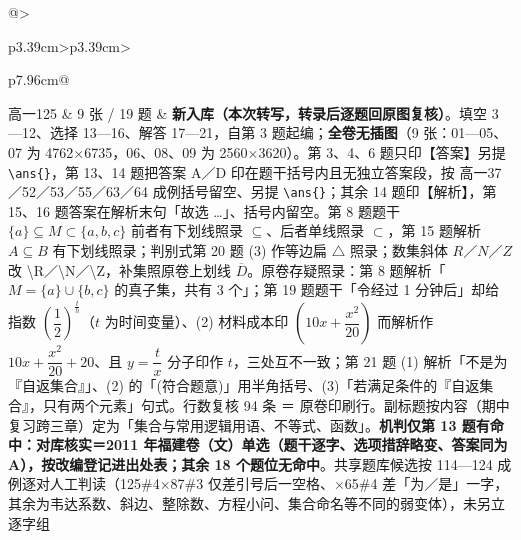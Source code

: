 \documentclass[a4paper,11pt]{article}
\begin{document}
\begin{xltabular}{\textwidth}{@{}>{\raggedright\arraybackslash}p{3.39cm}>{\centering\arraybackslash}p{3.39cm}>{\raggedright\arraybackslash}p{7.96cm}@{}}
高一125 & 9 张 / 19 题 & \textbf{新入库（本次转写，转录后逐题回原图复核）}。填空 3---12、选择 13---16、解答 17---21，自第 3 题起编；\textbf{全卷无插图}（9 张：01---05、07 为 4762$\times$6735，06、08、09 为 2560$\times$3620）。第 3、4、6 题只印【答案】另提 \texttt{\textbackslash{}ans\{\}}，第 13、14 题把答案 A／D 印在题干括号内且无独立答案段，按 高一37／52／53／55／63／64 成例括号留空、另提 \texttt{\textbackslash{}ans\{\}}；其余 14 题印【解析】，第 15、16 题答案在解析末句「故选 \ldots」、括号内留空。第 8 题题干 \(\{a\}\subseteq\allowbreak  M\subset\allowbreak \{a,b,c\}\) 前者有下划线照录 \(\subseteq\allowbreak \)、后者单线照录 \(\subset\allowbreak \)，第 15 题解析 \(A\subseteq\allowbreak  B\) 有下划线照录；判别式第 20 题 (3) 作等边扁 \(\triangle\) 照录；数集斜体 \(R\)／\(N\)／\(Z\) 改 \textbackslash R／\textbackslash N／\textbackslash Z，补集照原卷上划线 \(\overline{D}\)。原卷存疑照录：第 8 题解析「\(M=\allowbreak \{a\}\cup\allowbreak \{b,c\}\) 的真子集，共有 3 个」；第 19 题题干「令经过 1 分钟后」却给指数 \(\left(\dfrac12\right)^{\frac th}\)（\(t\) 为时间变量）、(2) 材料成本印 \(\left(10x+\allowbreak \dfrac{x^2}{20}\right)\) 而解析作 \(10x+\allowbreak \dfrac{x^2}{20}+\allowbreak 20\)、且 \(y=\allowbreak \dfrac tx\) 分子印作 \(t\)，三处互不一致；第 21 题 (1) 解析「不是为『自返集合』」、(2) 的「(符合题意)」用半角括号、(3)「若满足条件的『自返集合』，只有两个元素」句式。行数复核 94 条 ＝ 原卷印刷行。副标题按内容（期中复习跨三章）定为「集合与常用逻辑用语、不等式、函数」。\textbf{机判仅第 13 题有命中：对库核实＝2011 年福建卷（文）单选（题干逐字、选项措辞略变、答案同为 A），按改编登记进出处表；其余 18 个题位无命中}。共享题库候选按 114---124 成例逐对人工判读（125\#4$\times$87\#3 仅差引号后一空格、$\times$65\#4 差「为／是」一字，其余为韦达系数、斜边、整除数、方程小问、集合命名等不同的弱变体），未另立逐字组 \\ \addlinespace[1pt]

\end{xltabular}
\end{document}
